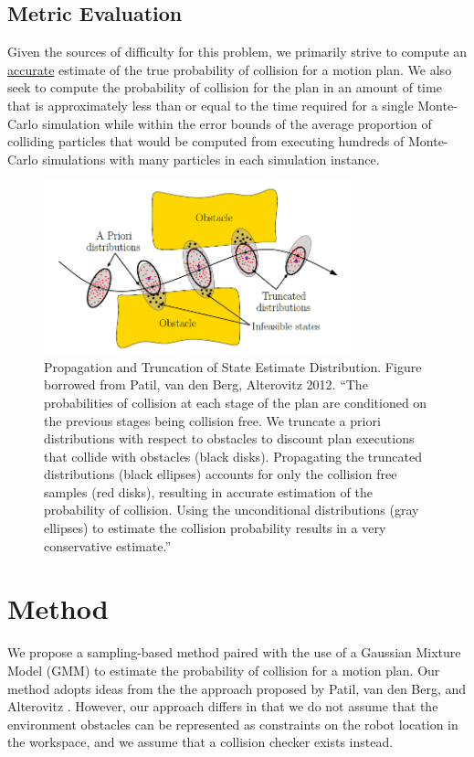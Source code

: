 \documentclass[journal]{IEEEtran}
\begin{document}

\subsection{Metric Evaluation}
Given the sources of difficulty for this problem, we primarily strive to compute an \underline{accurate} estimate of the true probability of collision for a motion plan. We also seek to compute the probability of collision for the plan in an amount of time that is approximately less than or equal to the time required for a single Monte-Carlo simulation while within the error bounds of the average proportion of colliding particles that would be computed from executing hundreds of Monte-Carlo simulations with many particles in each simulation instance.

\begin{figure}[!t]
\centering
\includegraphics[width=3.5in]{motion_pic.PNG}
\caption{Propagation and Truncation of State Estimate Distribution. Figure borrowed from Patil, van den Berg, Alterovitz 2012. ``The probabilities of collision at each stage of the plan are conditioned on the previous stages being collision free. We truncate a priori distributions with respect to obstacles to discount plan executions that collide with obstacles (black disks). Propagating the truncated distributions (black ellipses) accounts for only the collision free samples (red disks), resulting in accurate estimation of the probability of collision. Using the unconditional distributions (gray ellipses) to estimate the collision probability results in a very conservative estimate.''\cite{IEEEhowto:patil}}
\label{patil_figure}
\end{figure}

\section{Method}
We propose a sampling-based method paired with the use of a Gaussian Mixture Model (GMM) to estimate the probability of collision for a motion plan. Our method adopts ideas from the the approach proposed by Patil, van den Berg, and Alterovitz \cite{IEEEhowto:patil}. However, our approach differs in that we do not assume that the environment obstacles can be represented as constraints on the robot location in the workspace, and we assume that a collision checker exists instead.
\end{document}

